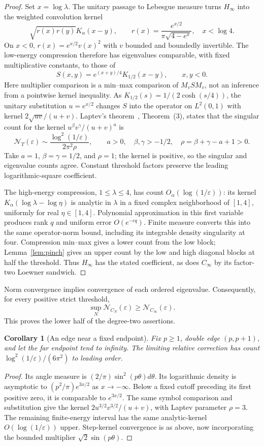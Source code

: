 \documentclass[11pt]{article}
\newtheorem{corollary}[theorem]{Corollary}
\newcommand{\N}{\mathcal N}
\begin{document}
\begin{proof}
Set $x=\log\lambda$. The unitary passage to Lebesgue measure turns
$H_\infty$ into the weighted convolution kernel
\[
 \sqrt{r(x)r(y)}K_\alpha(x-y),\qquad
 r(x)=\frac{e^{x/2}}{\pi\sqrt{4-e^x}},\quad x<\log4.
\]
On $x<0$, $r(x)=e^{x/2}v(x)^2$ with $v$ bounded and boundedly
invertible. The low-energy compression therefore has eigenvalues
comparable, with fixed multiplicative constants, to those of
\[
 S(x,y)=e^{(x+y)/4}K_{1/2}(x-y),\qquad x,y<0.
\]
Here multiplier comparison is a min--max comparison of
$M_vSM_v$, not an inference from a pointwise kernel inequality.
As $K_{1/2}(s)=1/(2\cosh(s/4))$, the unitary substitution
$u=e^{x/2}$ changes $S$ into the operator on $L^2(0,1)$ with kernel
$2\sqrt{uv}/(u+v)$.
Laptev's theorem~\cite{Laptev}, Theorem~(3), states that the singular
count for the kernel $u^\beta v^\gamma/(u+v)^a$ is
\[
 \N_T(\varepsilon)\sim
 \frac{\log^2(1/\varepsilon)}{2\pi^2\rho},\qquad
 a>0,\quad\beta,\gamma>-1/2,\quad\rho=\beta+\gamma-a+1>0.
\]
Take $a=1$, $\beta=\gamma=1/2$, and $\rho=1$; the kernel is positive,
so the singular and eigenvalue counts agree. Constant threshold factors
preserve the leading logarithmic-square coefficient.

The high-energy compression, $1\le\lambda\le4$, has count
$O_\alpha(\log(1/\varepsilon))$: its kernel
$K_\alpha(\log\lambda-\log\eta)$ is analytic in $\lambda$ in a fixed
complex neighborhood of $[1,4]$, uniformly for real $\eta\in[1,4]$.
Polynomial approximation in this first variable produces rank $q$
and uniform error $O(e^{-cq})$. Finite measure converts this into the
same operator-norm bound, including its integrable density singularity
at four. Compression min--max gives a lower count from the low block;
Lemma~\ref{lem:pinch} gives an upper count by the low and high diagonal
blocks at half the threshold. Thus $H_\infty$ has the stated coefficient,
as does $C_\infty$ by its factor-two Loewner sandwich.
\end{proof}

Norm convergence implies convergence of each ordered eigenvalue.
Consequently, for every positive strict threshold,
\[
 \sup_N\N_{C_N}(\varepsilon)\ge\N_{C_\infty}(\varepsilon).
\]
This proves the lower half of the degree-two assertions.

\begin{corollary}[An edge near a fixed endpoint]
Fix $p\ge1$, double edge $(p,p+1)$, and let the far endpoint tend to
infinity. The limiting relative correction has count
$\log^2(1/\varepsilon)/(6\pi^2)$ to leading order.
\end{corollary}
\begin{proof}
Its angle measure is $(2/\pi)\sin^2(p\theta)d\theta$.
Its logarithmic density is asymptotic to
$(p^2/\pi)e^{3x/2}$ as $x\to-\infty$.
Below a fixed cutoff preceding its first positive zero, it is comparable
to $e^{3x/2}$. The same symbol comparison and substitution give the
kernel $2u^{3/2}v^{3/2}/(u+v)$, with Laptev parameter $\rho=3$.
The remaining finite-energy interval has the same analytic-kernel
$O(\log(1/\varepsilon))$ upper. Step-kernel convergence is as above,
now incorporating the bounded multiplier $\sqrt2\sin(p\theta)$.
\end{proof}
\end{document}

